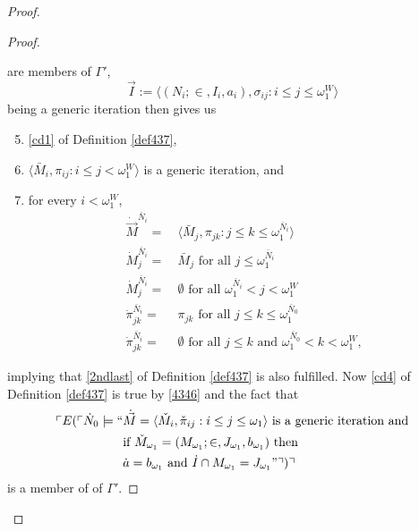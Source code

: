 \documentclass[12pt, twoside]{memoir}
\numberwithin{equation}{section}
\theoremstyle{definition}
\theoremstyle{remark}
\theoremstyle{definition}
\theoremstyle{definition}
\theoremstyle{definition}
\theoremstyle{remark}
\begin{document}
\begin{proof}
\begin{proof}
\begin{itemize}
\end{itemize}
are members of $\Gamma'$, 
\begin{equation*}
    \Vec{I} := \langle (N_i; \in, I_i, a_i), \sigma_{ij} : i \leq j \leq \omega_1^W \rangle
\end{equation*}
being a generic iteration then gives us
\begin{enumerate}[label=(\alph*)]
    \setcounter{enumi}{4}
    \item \ref{cd1} of Definition \ref{def437},
    \item $\langle \bar{M}_i, \pi_{ij} : i \leq j < \omega_1^W \rangle$ is a generic iteration, and
    \item for every $i < \omega_1^W$,
    \begin{align*}
         \dot{\Vec{M}}^{\bar{N}_i} = \ & \langle \bar{M}_j, \pi_{jk} : j \leq k \leq \omega_1^{\bar{N}_i} \rangle \\
         \dot{M}_j^{\bar{N}_i} = \ & \bar{M}_j \text{ for all } j \leq \omega_1^{\bar{N}_i} \\
         \dot{M}_j^{\bar{N}_i} = \ & \emptyset \text{ for all } \omega_1^{\bar{N}_i} < j < \omega_1^W \\
         \dot{\pi}_{jk}^{\bar{N}_i} = \ & \pi_{jk} \text{ for all } j \leq k \leq \omega_1^{\bar{N}_0} \\
         \dot{\pi}_{jk}^{\bar{N}_i} = \ & \emptyset \text{ for all } j \leq k \text{ and } \omega_1^{\bar{N}_0} < k < \omega_1^W \text{,}
    \end{align*}
\end{enumerate}
implying that \ref{2ndlast} of Definition \ref{def437} is also fulfilled. Now \ref{cd4} of Definition \ref{def437} is true by \ref{4346} and the fact that 
\begin{align*}
    \ulcorner E(\ulcorner \dot{N}_0 \models `` & \dot{\Vec{M}} = \langle \check{M}_{i}, \check{\pi}_{ij} : i \leq j \leq \omega_1 \rangle \text{ is a generic iteration and} \\ 
    & \text{if } \check{M}_{\omega_1} = (M_{\omega_1}; \in, J_{\omega_1}, b_{\omega_1}) \text{ then} \\
    &  \dot{a} = b_{\omega_1} \text{ and } \dot{I} \cap M_{\omega_1} = J_{\omega_1}" \urcorner) \urcorner
\end{align*}
is a member of of $\Gamma'$.


\end{proof}
\end{proof}
\end{document}
